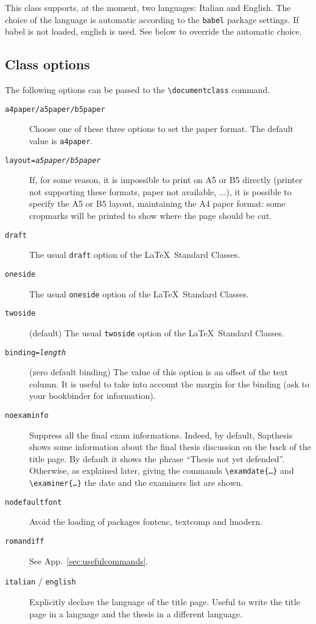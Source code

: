 \documentclass[a5paper,12pt]{article}
\newcommand{\bs}{\textbackslash}
\begin{document}
This class supports, at the moment, two languages: Italian and English. The choice of the language is automatic according to the \texttt{babel} package settings. If babel is not loaded, english is used. See below to override the automatic choice. 

\subsection{Class options}
\label{class_options}
The following options can be passed to the \texttt{\bs documentclass} command.

\begin{description}

\item[\texttt{a4paper/a5paper/b5paper}] Choose one of these three options to set the paper format. The default value is \texttt{a4paper}.
\item[\texttt{layout=\textsl{a5paper/b5paper}}] If, for some reason, it is impossible to print on A5 or B5 directly (printer not supporting these formats, paper not available, ...), it is possible to specify the A5 or B5 layout, maintaining the A4 paper format: some cropmarks will be printed to show where the page should be cut.
\item[\texttt{draft}] The usual \texttt{draft} option of the \LaTeX\ Standard Classes.
\item[\texttt{oneside}] The usual \texttt{oneside} option of the \LaTeX\ Standard Classes.
\item[\texttt{twoside}] (default) The usual \texttt{twoside} option of the \LaTeX\ Standard Classes.

\item[\texttt{binding=\textsl{length}}] (zero default binding)
The value of this option is an offset of the text column.
It is useful to take into account the margin for the binding (ask to your bookbinder for information).
\item[\texttt{noexaminfo}] Suppress all the final exam informations. Indeed, by default, \textsf{Sapthesis} shows some information about the final thesis discussion on the back of the title page. By default it shows the phrase ``Thesis not yet defended''. Otherwise, as explained later, giving the commands 
\texttt{\bs examdate\{\dots\}} and \texttt{\bs examiner\{\dots\}} the date and
the examiners list are shown.
\item[\texttt{nodefaultfont}] Avoid the loading of packages \textsf{fontenc}, \textsf{textcomp} and \textsf{lmodern}.
\item[\texttt{romandiff}] See App.~\ref{sec:usefulcommands}.
\item[\texttt{italian} / \texttt{english}] Explicitly declare the language of 
the title page. Useful to write the title page in a language 
and the thesis in a different language.
\end{description}
\end{document}
